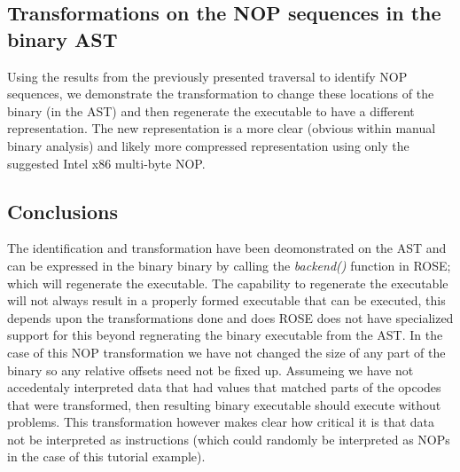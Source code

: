 \subsection{Transformations on the NOP sequences in the binary AST}

   Using the results from the previously presented traversal to identify
NOP sequences, we demonstrate the transformation to change these 
locations of the binary (in the AST) and then regenerate the executable 
to have a different representation. The new representation is a more clear
(obvious within manual binary analysis) and likely more compressed 
representation using only the suggested Intel x86 multi-byte NOP.



\subsection{Conclusions}


   The identification and transformation have been deomonstrated on the AST
and can be expressed in the binary binary by calling the {\em backend()} 
function in ROSE; which will regenerate the executable.  The capability to
regenerate the executable will not always result in a properly formed
executable that can be executed, this depends upon the transformations done
and does ROSE does not have specialized support for this beyond regnerating
the binary executable from the AST.  In the case of this NOP transformation
we have not changed the size of any part of the binary so any relative offsets 
need not be fixed up. Assumeing we have not accedentaly interpreted data that
had values that matched parts of the opcodes that were transformed, then resulting
binary executable should execute without problems.  This transformation however
makes clear how critical it is that data not be interpreted as instructions
(which could randomly be interpreted as NOPs in the case of this tutorial example).

